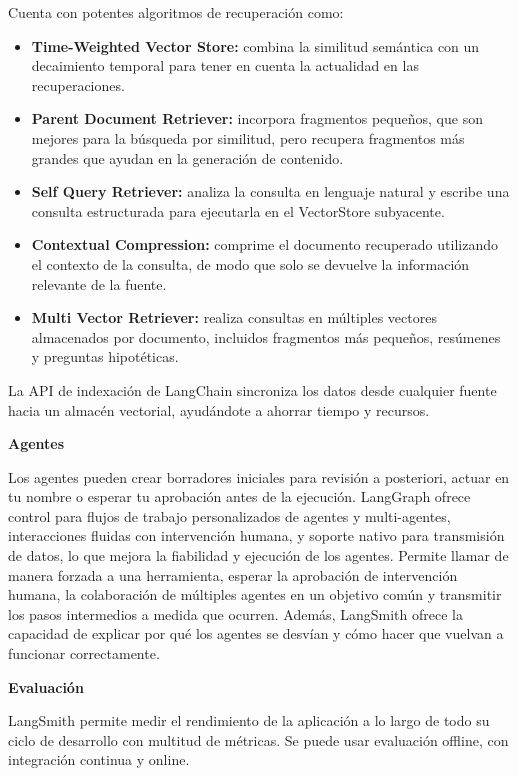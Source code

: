 Cuenta con potentes algoritmos de recuperación como:

\begin{itemize}
    \item \textbf{Time-Weighted Vector Store:} combina la similitud semántica con un decaimiento temporal para tener en cuenta la actualidad en las recuperaciones.
    \item \textbf{Parent Document Retriever:} incorpora fragmentos pequeños, que son mejores para la búsqueda por similitud, pero recupera fragmentos más grandes que ayudan en la generación de contenido.
    \item \textbf{Self Query Retriever:} analiza la consulta en lenguaje natural y escribe una consulta estructurada para ejecutarla en el VectorStore subyacente.
    \item \textbf{Contextual Compression:} comprime el documento recuperado utilizando el contexto de la consulta, de modo que solo se devuelve la información relevante de la fuente.
    \item \textbf{Multi Vector Retriever:} realiza consultas en múltiples vectores almacenados por documento, incluidos fragmentos más pequeños, resúmenes y preguntas hipotéticas.
\end{itemize}

La API de indexación de LangChain sincroniza los datos desde cualquier fuente hacia un almacén vectorial, ayudándote a ahorrar tiempo y recursos. \cite{PaginaLangChainOficialRAG}

\textbf{Agentes}

Los agentes pueden crear borradores iniciales para revisión a posteriori, actuar en tu nombre o esperar tu aprobación antes de la ejecución. LangGraph ofrece control para flujos de trabajo personalizados de agentes y multi-agentes, interacciones fluidas con intervención humana, y soporte nativo para transmisión de datos, lo que mejora la fiabilidad y ejecución de los agentes. Permite llamar de manera forzada a una herramienta, esperar la aprobación de intervención humana, la colaboración de múltiples agentes en un objetivo común y transmitir los pasos intermedios a medida que ocurren. Además, LangSmith ofrece la capacidad de explicar por qué los agentes se desvían y cómo hacer que vuelvan a funcionar correctamente. \cite{PaginaLangChainOficialAgentes}

\textbf{Evaluación}

LangSmith permite medir el rendimiento de la aplicación a lo largo de todo su ciclo de desarrollo con multitud de métricas. Se puede usar evaluación offline, con integración continua y online.

